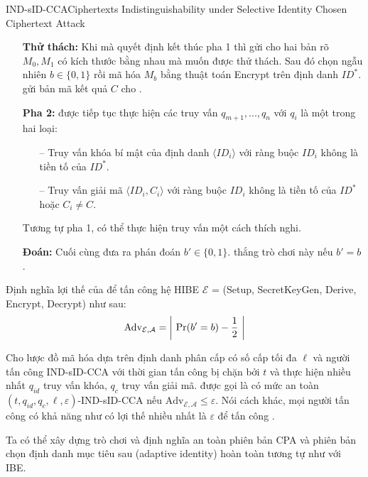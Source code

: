 \documentclass[class=report, crop=false]{standalone}
\begin{document}
\begin{game}{IND-sID-CCA}{Ciphertexts Indistinguishability under Selective Identity Chosen Ciphertext Attack}
\begin{itemize}[leftmargin=1.5cm, itemindent=-0.5cm]
					\item[] \textbf{Thử thách:} Khi mà \adversary quyết định kết thúc pha 1 thì \adversary gửi cho \challenger hai bản rõ $M_0, M_1$ có kích thước bằng nhau mà \adversary muốn được thử thách. Sau đó \challenger chọn ngẫu nhiên $b \in \{0, 1\}$ rồi mã hóa $M_b$ bằng thuật toán \textsf{Encrypt} trên định danh $ID^*$. \challenger gửi bản mã kết quả $C$ cho \adversary.
					\item[] \textbf{Pha 2:} \adversary được tiếp tục thực hiện các truy vấn $q_{m + 1}, ..., q_{n}$ với $q_i$ là một trong hai loại:
					\begin{itemize}
						\item[--] Truy vấn khóa bí mật của định danh $\langle ID_i \rangle$ với ràng buộc $ID_i$ không là tiền tố của $ID^*$.
						\item[--] Truy vấn giải mã $\langle ID_i, C_i \rangle$ với ràng buộc $ID_i$ không là tiền tố của $ID^*$ hoặc $C_i \neq C$.
					\end{itemize}
					Tương tự pha 1, \adversary có thể thực hiện truy vấn một cách thích nghi.
					\item[] \textbf{Đoán:} Cuối cùng \adversary đưa ra phán đoán $b' \in \{0, 1\}$. \adversary thắng trò chơi này nếu $b' = b$.
				\end{itemize}
				\vspace{-\baselineskip}
				Định nghĩa lợi thế của \adversary để tấn công hệ HIBE $\mathcal{E}$ = (\textsf{Setup, SecretKeyGen, Derive, Encrypt, Decrypt}) như sau:
				\[
					\text{Adv}_{\mathcal{E, A}} = \left| \ \text{Pr}(b' = b) - \frac{1}{2} \ \right|
				\]
			\end{game}
			\begin{definition}
				Cho lược đồ mã hóa dựa trên định danh phân cấp \scheme có số cấp tối đa $\ell$ và người tấn công IND-sID-CCA \adversary với thời gian tấn công bị chặn bởi $t$ và thực hiện nhiều nhất $q_{id}$ truy vấn khóa, $q_c$ truy vấn giải mã. \scheme được gọi là có mức an toàn $(t, q_{id}, q_c, \ell, \varepsilon)$-IND-sID-CCA nếu $\text{Adv}_{\mathcal{E, A}} \leq \varepsilon$. Nói cách khác, mọi người tấn công có khả năng như \adversary có lợi thế nhiều nhất là $\varepsilon$ để tấn công \scheme.
			\end{definition}
			Ta có thể xây dựng trò chơi và định nghĩa an toàn phiên bản CPA và phiên bản chọn định danh mục tiêu sau (adaptive identity) hoàn toàn tương tự như với IBE.
\end{document}

